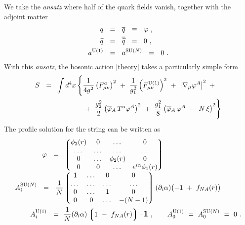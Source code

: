 \documentclass[12pt]{article}
\newcommand{\p}{\partial}
\newcommand{\wt}{\widetilde}
\newcommand{\ov}{\overline}
\newcommand{\lgr}{\left\lgroup}
\newcommand{\rgr}{\right\rgroup}
\newcommand{\aU}{a^{\rm U(1)}}
\newcommand{\aN}{a^\text{SU($N$)}}
\begin{document}
	We take the {\it ansatz} where half of the quark fields vanish, together with the adjoint matter
\begin{align*}
%
	q       & ~~=~~ \ov{q} ~~\equiv~~ \varphi~,  \\
%
	\wt{q}  & ~~=~~ \ov{\wt{q}} ~~=~~ 0~, \\
%
	\aU     & ~~=~~ \aN ~~=~~ 0~. 
\end{align*}
	With this {\it ansatz}, the bosonic action \eqref{theory} takes a particularly simple form
\begin{align}
%
\notag
	S ~~=~~ & \int d^4x\, 
	\Biggl\{  \frac{1}{4g^2}\left( F_{\mu\nu}^a \right)^2  ~+~ 
		 \frac{1}{g_1^2}\left( F_{\mu\nu}^{\rm U(1)} \right)^2 ~+~
		 \left| \nabla_\mu \varphi^A \right|^2 ~+~ \\
%
\label{redmodel}
	        & \phantom{ \int d^4x\, \Biggl\{ }
		~+~
		 \frac{g_2^2}{2} \left( \ov{\varphi}{}_A\,T^a\varphi^A \right)^2 ~+~
		 \frac{g_1^2}{8} \left( \ov{\varphi}{}_A\, \varphi^A ~-~ N\,\xi \right)^2
	\Biggr\}
\end{align}
	The profile solution for the string can be written as \cite{ABEKY}
\begin{align}
%
\notag
	\varphi   ~~=~~  &
		\lgr \begin{matrix}
			\phi_2(r) & 0     & \dots      & 0      \\
			\dots     & \dots & \dots      & \dots  \\
			0         & \dots & \phi_2(r)  & 0      \\
			0         &  0    & \dots      & e^{i\alpha}\phi_1(r) 
		     \end{matrix} \rgr
	\\
%
\label{string_reg}
	\\[-0.7cm]
%
\notag
	A_i^\text{SU($N$)}  ~~=~~
		\frac{1}{N} & \lgr \begin{matrix}
        			    	1       &   \dots   &  0       &   0   \\
        				\dots   &   \dots   &  \dots   & \dots \\
        				0       &   \dots   &  1       &   0   \\
        				0       &     0     &  \dots   & - (N-1) 
	   		         \end{matrix} \rgr
		(\p_i\alpha)\bigl( -1 ~+~ f_{NA}(r) \bigr)
	\\
%
\notag
	A_i^{\rm U(1)}  ~~=~~ & \frac{1}{N}(\p_i\alpha)\lgr 1 ~-~ f_{NA}(r) \rgr \cdot \mathlarger{\mathbf{1}}~,
	\qquad 
	A_0^{\rm U(1)} ~=~ A_0^\text{SU($N$)} ~=~ 0~.
\end{align}
\end{document}
